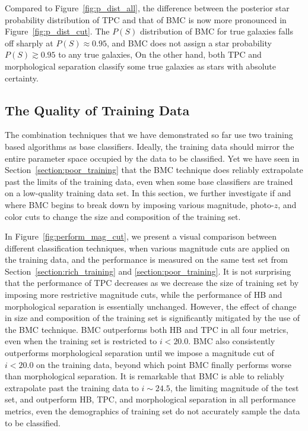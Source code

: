 Compared to Figure~\ref{fig:p_dist_all},
the difference between the posterior star probability distribution of
TPC and that of BMC is now more pronounced in Figure~\ref{fig:p_dist_cut}.
The $P\left(S\right)$ distribution of BMC for true galaxies
falls off sharply at $P\left(S\right)\approx0.95$,
and BMC does not assign a star probability
$P(S) \gtrsim 0.95$ to any true galaxies,
On the other hand, both TPC and morphological separation 
classify some true galaxies as stars with absolute certainty.



\subsection{The Quality of Training Data}
  \label{section:quality_training}

The combination techniques that we have demonstrated so far use
two training based algorithms as base classifiers.
Ideally, the training data should mirror the entire parameter space
occupied by the data to be classified.
Yet we have seen in Section~\ref{section:poor_training}
that the BMC technique does reliably
extrapolate past the limits of the training data,
even when some base classifiers are trained on a low-quality training data set.
In this section, we further investigate
if and where BMC begins to break down
by imposing various magnitude, photo-$z$, and color cuts
to change the size and composition of the training set.

In Figure~\ref{fig:perform_mag_cut}, we present
a visual comparison between different classification techniques,
when various magnitude cuts are applied on the training data,
and the performance is measured on the same test set
from Section~\ref{section:rich_training} and \ref{section:poor_training}.
It is not surprising that the performance of TPC decreases
as we decrease the size of training set
by imposing more restrictive magnitude cuts,
while the performance of HB and morphological separation
is essentially unchanged.
However, the effect of change in size and composition of the training set
is significantly mitigated by the use of the BMC technique.
BMC outperforms both HB and TPC in all four metrics,
even when the training set is restricted to $i < 20.0$.
BMC also consistently outperforms morphological separation
until we impose a magnitude cut of $i < 20.0$ on the training data,
beyond which point BMC finally performs worse than morphological separation.
It is remarkable that BMC is able to reliably extrapolate
past the training data to $i \sim 24.5$,
the limiting magnitude of the test set, and outperform HB, TPC,
and morphological separation in all performance metrics,
even the demographics of training set do not accurately sample 
the data to be classified.

